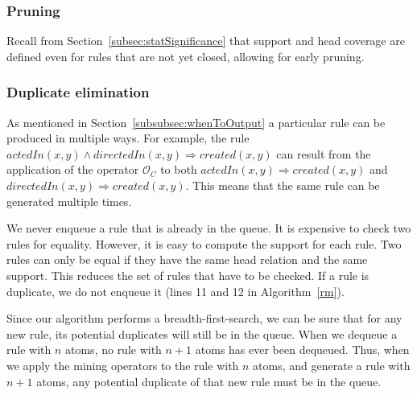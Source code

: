 \subsubsection{Pruning} 
\label{subsubsec:pruning}
Recall from Section~\ref{subsec:statSignificance} that support and head coverage are defined even for rules that are not yet closed, allowing for early pruning.

\subsubsection{Duplicate elimination} 
\label{subsubsec:duplicateElimination}
As mentioned in Section~\ref{subsubsec:whenToOutput} a particular rule can be produced in multiple ways.
For example, the rule $actedIn(x,y) \wedge directedIn(x,y) \Rightarrow created(x,y)$ can result from the application
of the operator $\mathcal{O}_C$ to both $actedIn(x,y) \Rightarrow created(x,y)$ and $directedIn(x,y) \Rightarrow created(x,y)$.
This means that the same rule can be generated multiple times.

We never enqueue a rule that is already in the queue. It is expensive to check two rules for equality.
However, it is easy to compute the support for each rule. Two rules can only be equal if they have the same head relation and
the same support. This reduces the set of rules that have to be checked. If a rule is duplicate, we do not enqueue it (lines 11 and 12 in Algorithm~\ref{rm}).

Since our algorithm performs a breadth-first-search, we can be sure that for any new rule, its potential duplicates will still be in the queue.
When we dequeue a rule with $n$ atoms, no rule with $n+1$ atoms has ever been dequeued. Thus, when we apply the mining operators to the rule with $n$ atoms, and generate a rule with $n+1$ atoms,
any potential duplicate of that new rule must be in the queue.

